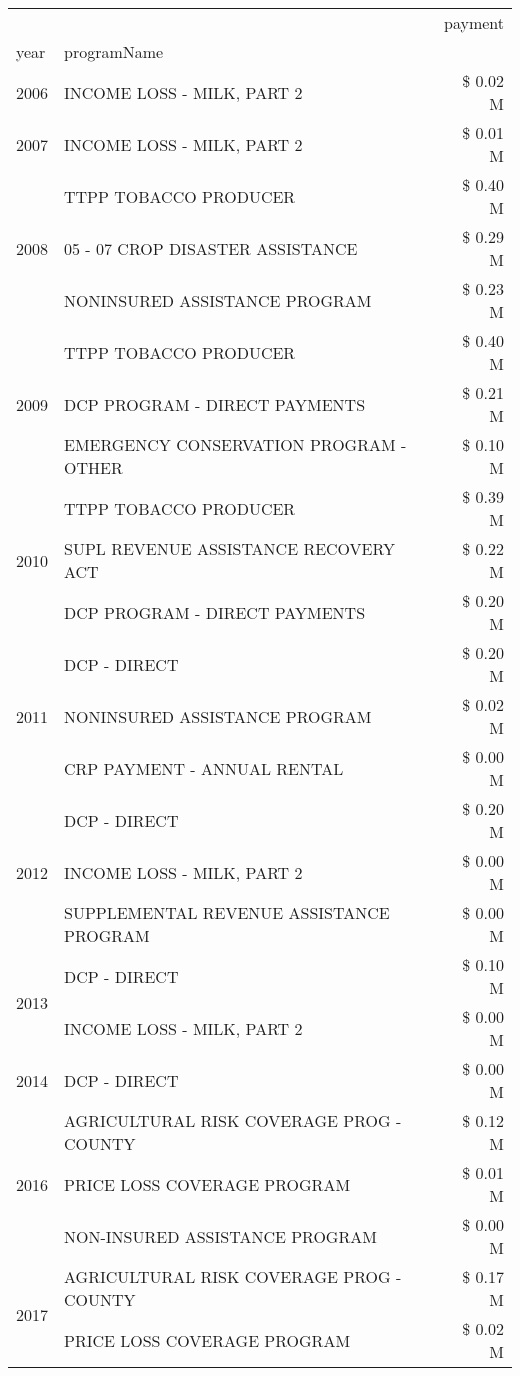 \begin{tabular}{llr}
\toprule
 &  & payment \\
year & programName &  \\
\midrule
2006 & INCOME LOSS - MILK, PART 2 & \$ 0.02 M \\
\cline{1-3}
2007 & INCOME LOSS - MILK, PART 2 & \$ 0.01 M \\
\cline{1-3}
\multirow[t]{3}{*}{2008} & TTPP TOBACCO PRODUCER & \$ 0.40 M \\
 & 05 - 07 CROP DISASTER ASSISTANCE & \$ 0.29 M \\
 & NONINSURED ASSISTANCE PROGRAM & \$ 0.23 M \\
\cline{1-3}
\multirow[t]{3}{*}{2009} & TTPP TOBACCO PRODUCER & \$ 0.40 M \\
 & DCP PROGRAM - DIRECT PAYMENTS & \$ 0.21 M \\
 & EMERGENCY CONSERVATION PROGRAM - OTHER & \$ 0.10 M \\
\cline{1-3}
\multirow[t]{3}{*}{2010} & TTPP TOBACCO PRODUCER & \$ 0.39 M \\
 & SUPL REVENUE ASSISTANCE RECOVERY ACT & \$ 0.22 M \\
 & DCP PROGRAM - DIRECT PAYMENTS & \$ 0.20 M \\
\cline{1-3}
\multirow[t]{3}{*}{2011} & DCP - DIRECT & \$ 0.20 M \\
 & NONINSURED ASSISTANCE PROGRAM & \$ 0.02 M \\
 & CRP PAYMENT - ANNUAL RENTAL & \$ 0.00 M \\
\cline{1-3}
\multirow[t]{3}{*}{2012} & DCP - DIRECT & \$ 0.20 M \\
 & INCOME LOSS - MILK, PART 2 & \$ 0.00 M \\
 & SUPPLEMENTAL REVENUE ASSISTANCE PROGRAM & \$ 0.00 M \\
\cline{1-3}
\multirow[t]{2}{*}{2013} & DCP - DIRECT & \$ 0.10 M \\
 & INCOME LOSS - MILK, PART 2 & \$ 0.00 M \\
\cline{1-3}
2014 & DCP - DIRECT & \$ 0.00 M \\
\cline{1-3}
\multirow[t]{3}{*}{2016} & AGRICULTURAL RISK COVERAGE PROG - COUNTY & \$ 0.12 M \\
 & PRICE LOSS COVERAGE PROGRAM & \$ 0.01 M \\
 & NON-INSURED ASSISTANCE PROGRAM & \$ 0.00 M \\
\cline{1-3}
\multirow[t]{3}{*}{2017} & AGRICULTURAL RISK COVERAGE PROG - COUNTY & \$ 0.17 M \\
 & PRICE LOSS COVERAGE PROGRAM & \$ 0.02 M \\

\end{tabular}
